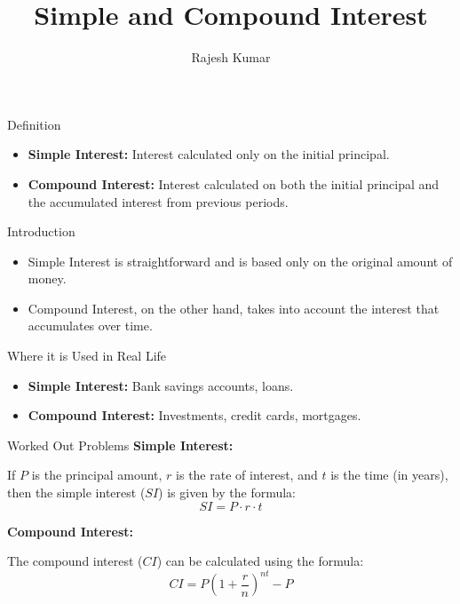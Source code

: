 \title{Simple and Compound Interest}
\author{Rajesh Kumar}
\date{}

\begin{frame}
  \titlepage
\end{frame}

\begin{frame}{Definition}
  \begin{itemize}
    \item \textbf{Simple Interest:} Interest calculated only on the initial principal.
    \item \textbf{Compound Interest:} Interest calculated on both the initial principal and the accumulated interest from previous periods.
  \end{itemize}
\end{frame}

\begin{frame}{Introduction}
  \begin{itemize}
    \item Simple Interest is straightforward and is based only on the original amount of money.
    \item Compound Interest, on the other hand, takes into account the interest that accumulates over time.
  \end{itemize}
\end{frame}

\begin{frame}{Where it is Used in Real Life}
  \begin{itemize}
    \item \textbf{Simple Interest:} Bank savings accounts, loans.
    \item \textbf{Compound Interest:} Investments, credit cards, mortgages.
  \end{itemize}
\end{frame}

\begin{frame}{Worked Out Problems}
  \textbf{Simple Interest:}
  
  If $P$ is the principal amount, $r$ is the rate of interest, and $t$ is the time (in years), then the simple interest ($SI$) is given by the formula:
  \[ SI = P \cdot r \cdot t \]

  \textbf{Compound Interest:}
  
  The compound interest ($CI$) can be calculated using the formula:
  \[ CI = P \left(1 + \frac{r}{n}\right)^{nt} - P \]
\end{frame}


